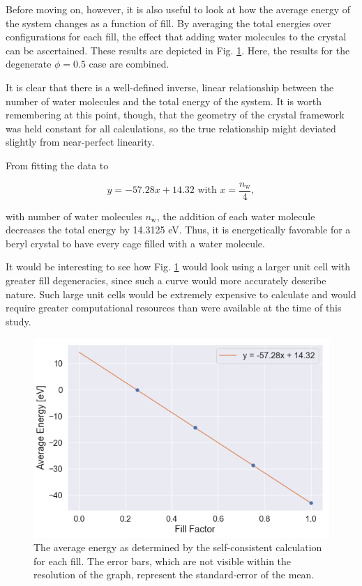         Before moving on, however, it is also useful to look at how the average energy of the system changes as a function of fill. By averaging the total energies over configurations for each fill, the effect that adding water molecules to the crystal can be ascertained. These results are depicted in Fig. \ref{fig:pmap_avg_energy}. Here, the results for the degenerate $\phi = 0.5$ case are combined.
        
        It is clear that there is a well-defined inverse, linear relationship between the number of water molecules and the total energy of the system. It is worth remembering at this point, though, that the geometry of the crystal framework was held constant for all calculations, so the true relationship might deviated slightly from near-perfect linearity. 
        
        From fitting the data to 
        
        \begin{equation}
            y = -57.28x+14.32 \text{ with } x = \frac{n_\text{w}}{4},
        \end{equation}
        
        \noindent with number of water molecules $n_\text{w}$, the addition of each water molecule decreases the total energy by 14.3125 eV. Thus, it is energetically favorable for a beryl crystal to have every cage filled with a water molecule.
        
        It would be interesting to see how Fig. \ref{fig:pmap_avg_energy} would look using a larger unit cell with greater fill degeneracies, since such a curve would more accurately describe nature. Such large unit cells would be extremely expensive to calculate and would require greater computational resources than were available at the time of this study.
        
        \begin{figure}
            \centering
            \includegraphics[width=0.9\linewidth]{Figures/System/pmap_broad_avg_energy.png}
            \caption{The average energy as determined by the self-consistent calculation for each fill. The error bars, which are not visible within the resolution of the graph, represent the standard-error of the mean.}
            \label{fig:pmap_avg_energy}
        \end{figure}
        
